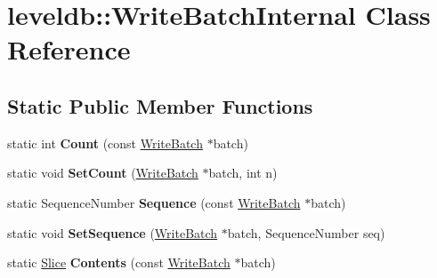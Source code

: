 \hypertarget{classleveldb_1_1_write_batch_internal}{}\section{leveldb\+:\+:Write\+Batch\+Internal Class Reference}
\label{classleveldb_1_1_write_batch_internal}
\subsection*{Static Public Member Functions}
\begin{DoxyCompactItemize}
\item 
\mbox{\label{classleveldb_1_1_write_batch_internal_a5270ca4567dbae1524005ad14e0698e3}} 
static int {\bfseries Count} (const \mbox{\hyperlink{classleveldb_1_1_write_batch}{Write\+Batch}} $\ast$batch)
\item 
\mbox{\label{classleveldb_1_1_write_batch_internal_ae03d20619da53aae175dd28d61c90bd9}} 
static void {\bfseries Set\+Count} (\mbox{\hyperlink{classleveldb_1_1_write_batch}{Write\+Batch}} $\ast$batch, int n)
\item 
\mbox{\label{classleveldb_1_1_write_batch_internal_af657c82bd9378b78c35a3a7429f945d4}} 
static Sequence\+Number {\bfseries Sequence} (const \mbox{\hyperlink{classleveldb_1_1_write_batch}{Write\+Batch}} $\ast$batch)
\item 
\mbox{\label{classleveldb_1_1_write_batch_internal_a0ca3483de37433fb0ce37b1e91f01bd1}} 
static void {\bfseries Set\+Sequence} (\mbox{\hyperlink{classleveldb_1_1_write_batch}{Write\+Batch}} $\ast$batch, Sequence\+Number seq)
\item 
\mbox{\label{classleveldb_1_1_write_batch_internal_a348947b16653c8a17590b13115b5274d}} 
static \mbox{\hyperlink{classleveldb_1_1_slice}{Slice}} {\bfseries Contents} (const \mbox{\hyperlink{classleveldb_1_1_write_batch}{Write\+Batch}} $\ast$batch)
\item 
\mbox{\label{classleveldb_1_1_write_batch_internal_adad424f13cc3e3ed4a2eacb88eaa39df}} 

\end{DoxyCompactItemize}
